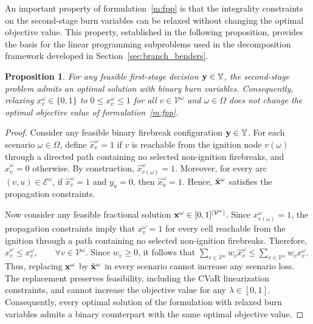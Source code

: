 \documentclass{itor}
\newtheorem{proposition}{Proposition}
\begin{document}
An important property of formulation~\eqref{m:fpp}
is that the integrality constraints on the second-stage burn variables can be relaxed without
changing the optimal objective value. This property,
established in the following proposition, provides
the basis for the linear programming subproblems
used in the decomposition framework developed
in Section~\ref{sec:branch_benders}.

\begin{proposition}
\label{prop:integrality_recourse}
For any feasible first-stage decision
$\vb{y}\in\mathbb{Y}$, the second-stage problem
admits an optimal solution with binary burn
variables. Consequently, relaxing
$x_v^\omega\in\{0,1\}$ to
$0\leq x_v^\omega\leq1$
for all $v\in\mathcal{V}^\omega$ and
$\omega\in\Omega$ does not change the
optimal objective value of
formulation~\eqref{m:fpp}.
\end{proposition}

\begin{proof}
Consider any feasible binary firebreak configuration
$\vb{y}\in\mathbb{Y}$. For each scenario
$\omega\in\Omega$, define
$\hat{x}_v^\omega=1$ if $v$ is reachable from
the ignition node $v(\omega)$ through a directed
path containing no selected non-ignition
firebreaks, and $\hat{x}_v^\omega=0$ otherwise. By construction,
$\hat{x}_{v(\omega)}^\omega=1$.
Moreover, for every arc
$(v,u)\in\mathcal{E}^\omega$, if
$\hat{x}_v^\omega=1$ and $y_u=0$, then
$\hat{x}_u^\omega=1$. Hence,
$\hat{\vb{x}}^\omega$ satisfies the
propagation constraints.

Now consider any feasible fractional solution
$\vb{x}^\omega\in[0,1]^{|\mathcal{V}^\omega|}$.
Since $x_{v(\omega)}^\omega=1$, the propagation
constraints imply that $x_v^\omega=1$
for every cell reachable from the ignition
through a path containing no selected
non-ignition firebreaks. Therefore, 
$\hat{x}_v^\omega\leq x_v^\omega,
\qquad
\forall v\in\mathcal{V}^\omega$. 
Since $w_v\geq0$, it follows that $\sum_{v\in\mathcal{V}^\omega}
w_v\hat{x}_v^\omega
\leq
\sum_{v\in\mathcal{V}^\omega}
w_vx_v^\omega$. Thus, replacing $\vb{x}^\omega$ by
$\hat{\vb{x}}^\omega$ in every scenario
cannot increase any scenario loss.
The replacement preserves feasibility,
including the CVaR linearization
constraints, and cannot increase the
objective value for any $\lambda\in[0,1]$. Consequently, every optimal solution
of the formulation with relaxed burn
variables admits a binary counterpart
with the same optimal objective value.
\end{proof}
\end{document}
